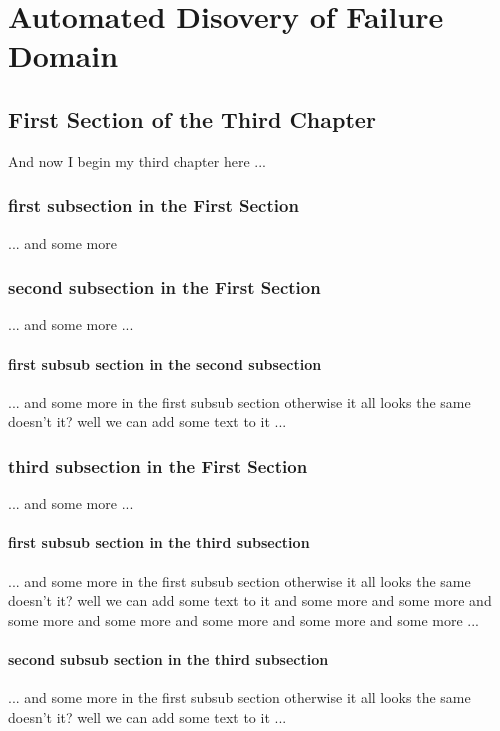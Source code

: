 \chapter{Automated Disovery of Failure Domain}
\ifpdf
    \graphicspath{{Adfd/AdfdFigs/PNG/}{Adfd/AdfdFigs/PDF/}{Adfd/AdfdFigs/}}
\else
    \graphicspath{{Adfd/AdfdFigs/EPS/}{Adfd/AdfdFigs/}}
\fi

\section{First Section of the Third Chapter}
And now I begin my third chapter here ...

\subsection{first subsection in the First Section}
... and some more 

\subsection{second subsection in the First Section}
... and some more ...

\subsubsection{first subsub section in the second subsection}
... and some more in the first subsub section otherwise it all looks the same
doesn't it? well we can add some text to it ...

\subsection{third subsection in the First Section}
... and some more ...

\subsubsection{first subsub section in the third subsection}
... and some more in the first subsub section otherwise it all looks the same
doesn't it? well we can add some text to it and some more and some more and
some more and some more and some more and some more and some more ...

\subsubsection{second subsub section in the third subsection}
... and some more in the first subsub section otherwise it all looks the same
doesn't it? well we can add some text to it ...

